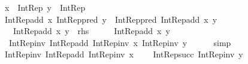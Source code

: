 \begin{isabellebody}
\ \ \ {\isachardoublequoteopen}x\ {\isacharcolon}{\kern0pt}\ Int{\isacharunderscore}{\kern0pt}Rep{\isachardoublequoteclose}\ {\isachardoublequoteopen}y\ {\isacharcolon}{\kern0pt}\ Int{\isacharunderscore}{\kern0pt}Rep{\isachardoublequoteclose}\isanewline
\ \ \ {\isachardoublequoteopen}Int{\isacharunderscore}{\kern0pt}Rep{\isacharunderscore}{\kern0pt}add\ x\ {\isacharparenleft}{\kern0pt}Int{\isacharunderscore}{\kern0pt}Rep{\isacharunderscore}{\kern0pt}pred\ y{\isacharparenright}{\kern0pt}\ {\isacharequal}{\kern0pt}\ Int{\isacharunderscore}{\kern0pt}Rep{\isacharunderscore}{\kern0pt}pred\ {\isacharparenleft}{\kern0pt}Int{\isacharunderscore}{\kern0pt}Rep{\isacharunderscore}{\kern0pt}add\ x\ y{\isacharparenright}{\kern0pt}{\isachardoublequoteclose}\isanewline
\ \ \ \ {\isacharparenleft}{\kern0pt}\ {\isachardoublequoteopen}Int{\isacharunderscore}{\kern0pt}Rep{\isacharunderscore}{\kern0pt}add\ x\ {\isacharquery}{\kern0pt}y\ {\isacharequal}{\kern0pt}\ {\isacharquery}{\kern0pt}rhs{\isachardoublequoteclose}{\isacharparenright}{\kern0pt}\isanewline
%
\isadelimproof
%
\endisadelimproof
%
\isatagproof
{}\isamarkupfalse%
\ {\isacharminus}{\kern0pt}\isanewline
\ \ \isamarkupfalse%
\ {\isachardoublequoteopen}Int{\isacharunderscore}{\kern0pt}Rep{\isacharunderscore}{\kern0pt}add\ x\ {\isacharquery}{\kern0pt}y\ {\isacharequal}{\kern0pt}\isanewline
\ \ \ \ Int{\isacharunderscore}{\kern0pt}Rep{\isacharunderscore}{\kern0pt}inv\ {\isacharparenleft}{\kern0pt}Int{\isacharunderscore}{\kern0pt}Rep{\isacharunderscore}{\kern0pt}add\ {\isacharparenleft}{\kern0pt}Int{\isacharunderscore}{\kern0pt}Rep{\isacharunderscore}{\kern0pt}inv\ x{\isacharparenright}{\kern0pt}\ {\isacharparenleft}{\kern0pt}Int{\isacharunderscore}{\kern0pt}Rep{\isacharunderscore}{\kern0pt}inv\ {\isacharquery}{\kern0pt}y{\isacharparenright}{\kern0pt}{\isacharparenright}{\kern0pt}{\isachardoublequoteclose}\isanewline
\ \ \ \ \isamarkupfalse%
\ simp\isanewline
\ \ \isamarkupfalse%
\ \isamarkupfalse%
\ {\isachardoublequoteopen}{\isachardot}{\kern0pt}{\isachardot}{\kern0pt}{\isachardot}{\kern0pt}\ {\isacharequal}{\kern0pt}\ Int{\isacharunderscore}{\kern0pt}Rep{\isacharunderscore}{\kern0pt}inv\ {\isacharparenleft}{\kern0pt}Int{\isacharunderscore}{\kern0pt}Rep{\isacharunderscore}{\kern0pt}add\ {\isacharparenleft}{\kern0pt}Int{\isacharunderscore}{\kern0pt}Rep{\isacharunderscore}{\kern0pt}inv\ x{\isacharparenright}{\kern0pt}\isanewline
\ \ \ \ {\isacharparenleft}{\kern0pt}Int{\isacharunderscore}{\kern0pt}Rep{\isacharunderscore}{\kern0pt}succ\ {\isacharparenleft}{\kern0pt}Int{\isacharunderscore}{\kern0pt}Rep{\isacharunderscore}{\kern0pt}inv\ y{\isacharparenright}{\kern0pt}{\isacharparenright}{\kern0pt}{\isacharparenright}{\kern0pt}{\isachardoublequoteclose}\isanewline

\end{isabellebody}
